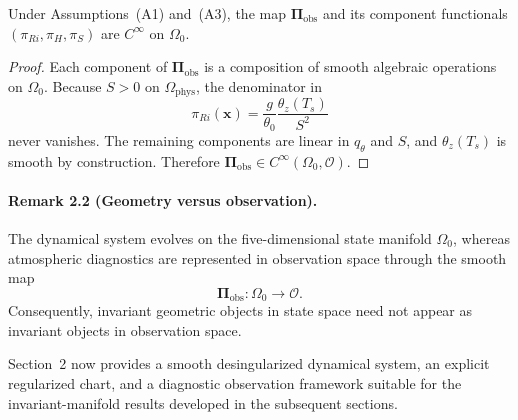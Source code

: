 \begin{proposition}
Under Assumptions~(A1) and~(A3), the map $\boldsymbol{\Pi}_{\mathrm{obs}}$ and its component functionals $(\pi_{Ri}, \pi_H, \pi_S)$ are $C^\infty$ on $\Omega_0$.
\end{proposition}

\begin{proof}
Each component of $\boldsymbol{\Pi}_{\mathrm{obs}}$ is a composition of smooth algebraic operations on $\Omega_0$. Because $S > 0$ on $\Omega_{\mathrm{phys}}$, the denominator in
\begin{equation}
\pi_{Ri}(\mathbf{x}) = \frac{g}{\theta_0}\frac{\theta_z(T_s)}{S^2}
\end{equation}
never vanishes. The remaining components are linear in $q_\theta$ and $S$, and $\theta_z(T_s)$ is smooth by construction. Therefore $\boldsymbol{\Pi}_{\mathrm{obs}} \in C^\infty(\Omega_0, \mathcal O)$.
\end{proof}

\paragraph{Remark 2.2 (Geometry versus observation).}
The dynamical system evolves on the five-dimensional state manifold $\Omega_0$, whereas atmospheric diagnostics are represented in observation space through the smooth map
\begin{equation}
\boldsymbol{\Pi}_{\mathrm{obs}} : \Omega_0 \to \mathcal O.
\end{equation}
Consequently, invariant geometric objects in state space need not appear as invariant objects in observation space.

Section~2 now provides a smooth desingularized dynamical system, an explicit regularized chart, and a diagnostic observation framework suitable for the invariant-manifold results developed in the subsequent sections.